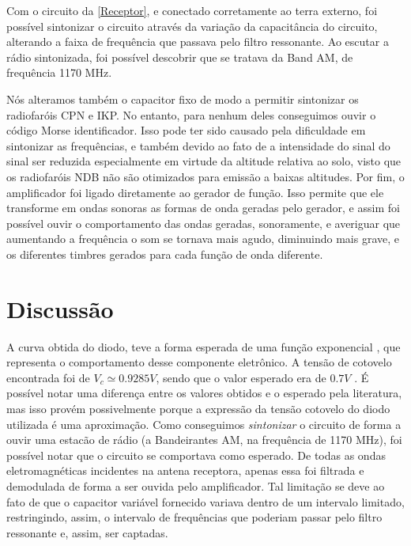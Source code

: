 \documentclass[11pt,a4paper]{article}
\begin{document}
    Com o circuito da \cref{Receptor}, e conectado corretamente ao terra externo, foi possível sintonizar o circuito através da variação da capacitância do circuito, alterando a faixa de frequência que passava pelo filtro ressonante. Ao escutar a rádio sintonizada, foi possível descobrir que se tratava da Band AM, de frequência 1170 MHz.
    
    Nós alteramos também o capacitor fixo de modo a permitir sintonizar os radiofaróis CPN e IKP. No entanto, para nenhum deles conseguimos ouvir o código Morse identificador. Isso pode ter sido causado pela dificuldade em sintonizar as frequências, e também devido ao fato de a intensidade do sinal do sinal ser reduzida especialmente em virtude da altitude relativa ao solo, visto que os radiofaróis NDB não são otimizados para emissão a baixas altitudes.
    Por fim, o amplificador foi ligado diretamente ao gerador de função. Isso permite que ele transforme em ondas sonoras as formas de onda geradas pelo gerador, e assim foi possível ouvir o comportamento das ondas geradas, sonoramente, e averiguar que aumentando a frequência o som se tornava mais agudo, diminuindo mais grave, e os diferentes timbres gerados para cada função de onda diferente.


\section{Discussão}

    A curva obtida do diodo, teve a forma esperada de uma função exponencial \cite{livro}, que representa o comportamento desse componente eletrônico. A tensão de cotovelo encontrada foi de $V_c \simeq 0.9285 V$,  sendo que o valor esperado era de $0.7 V$ \cite{diodo}. É possível notar uma diferença entre os valores obtidos e o esperado pela literatura, mas isso provém possivelmente porque a expressão da tensão cotovelo do diodo utilizada é uma aproximação. 
    Como conseguimos \textit{sintonizar} o circuito de forma a ouvir uma estacão de rádio (a Bandeirantes AM, na frequência de 1170 MHz), foi possível notar que o circuito se comportava como esperado. De todas as ondas eletromagnéticas incidentes na antena receptora, apenas essa foi filtrada e demodulada de forma a ser ouvida pelo amplificador. Tal limitação se deve ao fato de que o capacitor variável fornecido variava dentro de um intervalo limitado, restringindo, assim, o intervalo de frequências que poderiam passar pelo filtro ressonante e, assim, ser captadas.
    
\end{document}
